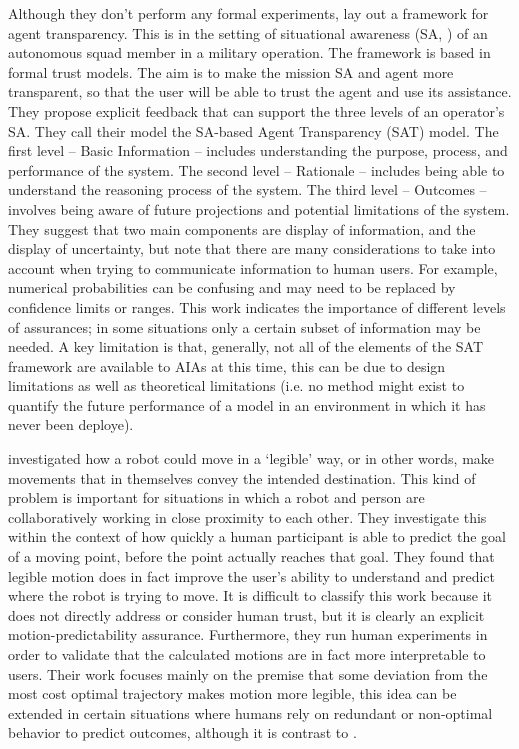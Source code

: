 Although they don't perform any formal experiments, \citet{Chen2014-dk} lay out a framework for agent transparency. This is in the setting of situational awareness (SA, \cite{Endsley1995-ie}) of an autonomous squad member in a military operation. The framework is based in formal trust models. The aim is to make the mission SA and agent more transparent, so that the user will be able to trust the agent and use its assistance. They propose explicit feedback that can support the three levels of an operator's SA. They call their model the SA-based Agent Transparency (SAT) model. The first level -- Basic Information -- includes understanding the purpose, process, and performance of the system. The second level -- Rationale -- includes being able to understand the reasoning process of the system. The third level -- Outcomes -- involves being aware of future projections and potential limitations of the system. They suggest that two main components are display of information, and the display of uncertainty, but note that there are many considerations to take into account when trying to communicate information to human users. For example, numerical probabilities can be confusing and may need to be replaced by confidence limits or ranges. This work indicates the importance of different levels of assurances; in some situations only a certain subset of information may be needed. A key limitation is that, generally, not all of the elements of the SAT framework are available to AIAs at this time, this can be due to design limitations as well as theoretical limitations (i.e. no method might exist to quantify the future performance of a model in an environment in which it has never been deploye).

\citet{Dragan2013-wd} investigated how a robot could move in a `legible' way, or in other words, make movements that in themselves convey the intended destination. This kind of problem is important for situations in which a robot and person are collaboratively working in close proximity to each other. They investigate this within the context of how quickly a human participant is able to predict the goal of a moving point, before the point actually reaches that goal. They found that legible motion does in fact improve the user's ability to understand and predict where the robot is trying to move. It is difficult to classify this work because it does not directly address or consider human trust, but it is clearly an explicit motion-predictability assurance. Furthermore, they run human experiments in order to validate that the calculated motions are in fact more interpretable to users. Their work focuses mainly on the premise that some deviation from the most cost optimal trajectory makes motion more legible, this idea can be extended in certain situations where humans rely on redundant or non-optimal behavior to predict outcomes, although it is contrast to \citet{Wu2016-ei}.


